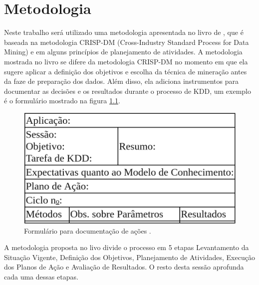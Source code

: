 \documentclass[diss-proposta,nocipinfo]{texufpel}
\begin{document}
\chapter{Metodologia}


Neste trabalho será utilizado uma metodologia apresentada no livro de \citet{goldschmidt2015data}, que é baseada na metodologia CRISP-DM (Cross-Industry Standard Process for Data Mining) e em alguns princípios de planejamento de atividades. A metodologia mostrada no livro se difere da metodologia CRISP-DM no momento em que ela sugere aplicar a definição dos objetivos e escolha da técnica de mineração antes da faze de preparação dos dados. Além disso, ela adiciona instrumentos para documentar as decisões e os resultados durante o processo de KDD, um exemplo é o formulário mostrado na figura \ref{fig:formulario-para-documentacao-de-acoes}.

\begin{figure}[htbp]
  \centering \includegraphics[scale=.4]{imagens/formulario-para-documentacao-de-acoes.png}
  \caption{Formulário para documentação de ações \cite{goldschmidt2015data}.}
  \label{fig:formulario-para-documentacao-de-acoes}
\end{figure}

A metodologia proposta no livo divide o processo em 5 etapas Levantamento da Situação Vigente, Definição dos Objetivos, Planejamento de Atividades, Execução dos Planos de Ação e Avaliação de Resultados. O resto desta sessão aprofunda cada uma dessas etapas.
\end{document}

